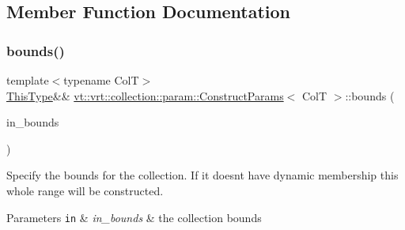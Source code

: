 \subsection{Member Function Documentation}
\mbox{\label{structvt_1_1vrt_1_1collection_1_1param_1_1_construct_params_a51f2e63f9685930f39c646886e778c32}} 
\subsubsection{\texorpdfstring{bounds()}{bounds()}}
{\footnotesize\ttfamily template$<$typename ColT$>$ \\
\hyperlink{structvt_1_1vrt_1_1collection_1_1param_1_1_construct_params_a13d4910c0f6825c7b0ddfebce5288bea}{This\+Type}\&\& \hyperlink{structvt_1_1vrt_1_1collection_1_1param_1_1_construct_params}{vt\+::vrt\+::collection\+::param\+::\+Construct\+Params}$<$ ColT $>$\+::bounds (\begin{DoxyParamCaption}\item[{\hyperlink{structvt_1_1vrt_1_1collection_1_1param_1_1_construct_params_a7bc8d5d57e377e0f2e60031582eeb7e6}{Index\+Type}}]{in\+\_\+bounds }\end{DoxyParamCaption})\hspace{0.3cm}{\ttfamily [inline]}}



Specify the bounds for the collection. If it doesn\textquotesingle{}t have dynamic membership this whole range will be constructed. 


\begin{DoxyParams}[1]{Parameters}
\mbox{\tt in}  & {\em in\+\_\+bounds} & the collection bounds \\
\hline
\end{DoxyParams}
\mbox{\label{structvt_1_1vrt_1_1collection_1_1param_1_1_construct_params_af03cf3f305c56e36de87c537e8356f0a}} 
